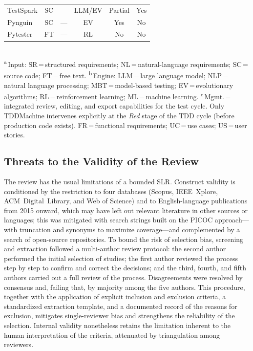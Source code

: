 \documentclass[10pt,journal,twoside,letterpaper]{IEEEtran}
\begin{document}
\begin{table}[!tb]
\begin{tabular}{@{}lccccc@{}}
            TestSpark \cite{sapozhnikov2024testspark}   & SC & ---   & LLM/EV & Partial & Yes \\
            Pynguin \cite{lukasczyk2022pynguin}         & SC & ---   & EV     & Yes   & No \\
            Pytester \cite{takerngsaksiri2025pytester}  & FT & ---   & RL     & No    & No \\
            \bottomrule
        \end{tabular}
        \\[3pt]
        {\footnotesize \textsuperscript{a}\,Input: SR\,=\,structured requirements; NL\,=\,natural-language requirements; SC\,=\,source code; FT\,=\,free text. \textsuperscript{b}\,Engine: LLM\,=\,large language model; NLP\,=\,natural language processing; MBT\,=\,model-based testing; EV\,=\,evolutionary algorithms; RL\,=\,reinforcement learning; ML\,=\,machine learning. \textsuperscript{c}\,Mgmt.\,=\,integrated review, editing, and export capabilities for the test cycle. Only TDDMachine intervenes explicitly at the \emph{Red} stage of the TDD cycle (before production code exists). FR\,=\,functional requirements; UC\,=\,use cases; US\,=\,user stories.}
    \end{table}
    
    \subsection{Threats to the Validity of the Review}
    \label{subsec:amenazas}
    
    The review has the usual limitations of a bounded SLR. Construct validity is conditioned by the restriction to four databases (Scopus, IEEE~Xplore, ACM~Digital~Library, and Web of Science) and to English-language publications from 2015 onward, which may have left out relevant literature in other sources or languages; this was mitigated with search strings built on the PICOC approach---with truncation and synonyms to maximize coverage---and complemented by a search of open-source repositories. To bound the risk of selection bias, screening and extraction followed a multi-author review protocol: the second author performed the initial selection of studies; the first author reviewed the process step by step to confirm and correct the decisions; and the third, fourth, and fifth authors carried out a full review of the process. Disagreements were resolved by consensus and, failing that, by majority among the five authors. This procedure, together with the application of explicit inclusion and exclusion criteria, a standardized extraction template, and a documented record of the reasons for exclusion, mitigates single-reviewer bias and strengthens the reliability of the selection. Internal validity nonetheless retains the limitation inherent to the human interpretation of the criteria, attenuated by triangulation among reviewers.
    
\end{document}
